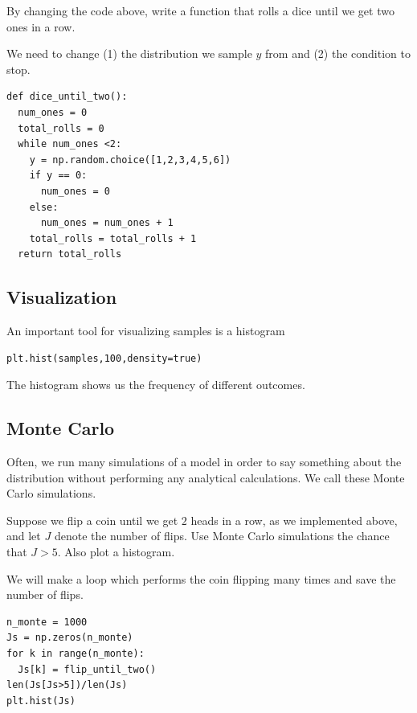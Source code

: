 \begin{exercise}
By changing the code above, write a function that rolls a dice until we get two ones in a row.
\end{exercise}
\begin{solution}
We need to change (1) the distribution we sample $y$ from and (2) the condition to stop. 
\begin{Verbatim}
def dice_until_two():
  num_ones = 0
  total_rolls = 0
  while num_ones <2:
    y = np.random.choice([1,2,3,4,5,6])
    if y == 0:
      num_ones = 0
    else:
      num_ones = num_ones + 1
    total_rolls = total_rolls + 1
  return total_rolls
 \end{Verbatim}
\end{solution}

\subsection{Visualization}

 An important tool for visualizing samples is a histogram
\begin{Verbatim}
plt.hist(samples,100,density=true)
 \end{Verbatim}
 The histogram shows us the frequency of different outcomes.



\subsection{Monte Carlo}
Often, we run many simulations of a model in order to say something about the distribution without performing any analytical calculations. We call these {\dfn Monte Carlo} simulations.
\begin{example}
Suppose we flip a coin until we get $2$ heads in a row, as we implemented above, and let $J$ denote the number of flips. Use Monte Carlo simulations the chance that $J>5$. Also plot a histogram. 
\end{example}
\begin{solution}
We will make a loop which performs the coin flipping many times and save the number of flips. 
\begin{Verbatim}
n_monte = 1000
Js = np.zeros(n_monte)
for k in range(n_monte):
  Js[k] = flip_until_two()
len(Js[Js>5])/len(Js)
plt.hist(Js)
 \end{Verbatim}
\end{solution}







